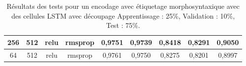\begin{table}[H]
{\begin{tabular}{|c|c|c|c|c|c|c|c|c|}
				256            & 512                     & relu                & rmsprop            & 0,9751                             & 0,9739                                & 0,8418                    & 0,8291                       & 0,9050                \\ \hline
				64             & 512                     & relu                & rmsprop            & 0,9761                             & 0,9750                                & 0,8275                    & 0,8201                       & 0,8997                \\ \hline
			\end{tabular}%
		}
		\caption{Résultats des tests pour un encodage avec étiquetage morphosyntaxique avec des cellules LSTM avec découpage Apprentissage : 25\%, Validation : 10\%, Test : 75\%.}
		\label{tab:lstm_1_postag}
	\end{table}
